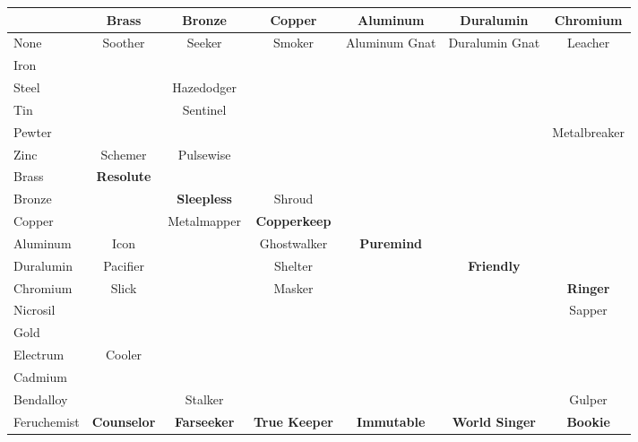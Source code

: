 \documentclass[conference]{IEEEtran}
\begin{document}
\begin{table}[h]
\begin{center}
\begin{tabular}{|l |c |c |c |c |c |c | }
		\cellcolor{black}&Brass&Bronze&Copper&Aluminum&Duralumin&Chromium\\\hline 
		
		\hline
		None	&\cellcolor{darkgreen}\cellcolor{darkgreen}Soother& \cellcolor{darkgreen}Seeker&\cellcolor{darkgreen}Smoker&\cellcolor{darkgreen}Aluminum Gnat&\cellcolor{darkgreen}Duralumin Gnat&\cellcolor{darkgreen}Leacher\\\hline
		
		Iron	& & & & \cellcolor{gray}&\cellcolor{gray} & \\\hline
		Steel	& &\cellcolor{lightgreen}Hazedodger& &\cellcolor{gray} &\cellcolor{gray} & \\\hline
		Tin& &\cellcolor{lightgreen}Sentinel&&\cellcolor{gray}  &\cellcolor{gray} & \\\hline
		Pewter& & &&\cellcolor{gray} & \cellcolor{gray}& \cellcolor{lightgreen}Metalbreaker\\\hline
		Zinc&\cellcolor{lightgreen} Schemer&  \cellcolor{lightgreen}Pulsewise&&\cellcolor{gray} &\cellcolor{gray} &\\\hline
		Brass&\cellcolor{lightred}\textbf{Resolute}& &&\cellcolor{gray} & \cellcolor{gray}&\\\hline
		Bronze& &\cellcolor{lightgreen}\textbf{Sleepless}& \cellcolor{lightgreen}Shroud &\cellcolor{gray} & \cellcolor{gray}& \\\hline
		Copper& & \cellcolor{lightgreen}Metalmapper& \cellcolor{lightgreen}\textbf{Copperkeep}&\cellcolor{gray} & \cellcolor{gray}& \\\hline
		Aluminum& \cellcolor{lightgreen}Icon & & \cellcolor{lightgreen}Ghostwalker & \cellcolor{lightgreen}\textbf{Puremind} &\cellcolor{gray} &\\\hline
		Duralumin& \cellcolor{lightgreen}Pacifier && \cellcolor{lightgreen}Shelter  &\cellcolor{gray}&\cellcolor{lightgreen} \textbf{Friendly}& \\\hline
		Chromium&\cellcolor{lightgreen}Slick&&\cellcolor{lightgreen}Masker&\cellcolor{gray}  &\cellcolor{gray}  &\cellcolor{lightgreen} \textbf{Ringer}\\\hline
		Nicrosil&&&& \cellcolor{gray} &  \cellcolor{gray}& \cellcolor{lightgreen}Sapper \\\hline
		Gold&&&&\cellcolor{gray}&\cellcolor{gray}&\\\hline
		Electrum&\cellcolor{lightorange}Cooler && &\cellcolor{gray}&  \cellcolor{gray}&    \\\hline
		Cadmium& & &&  \cellcolor{gray}&  \cellcolor{gray}&  \\\hline
		Bendalloy&&\cellcolor{lightgreen}Stalker&&\cellcolor{gray}&\cellcolor{gray} &\cellcolor{lightgreen}Gulper  \\\hline
		Feruchemist&\cellcolor{lightblue} \textbf{Counselor}&\cellcolor{lightblue} \textbf{Farseeker}&\cellcolor{lightblue} \textbf{True Keeper}&\cellcolor{lightblue} \textbf{Immutable}  &\cellcolor{lightblue} \textbf{World Singer}  &\cellcolor{lightblue} \textbf{Bookie}  \\\hline			\hline
		

\end{tabular}
\end{center}
\end{table}
\end{document}
